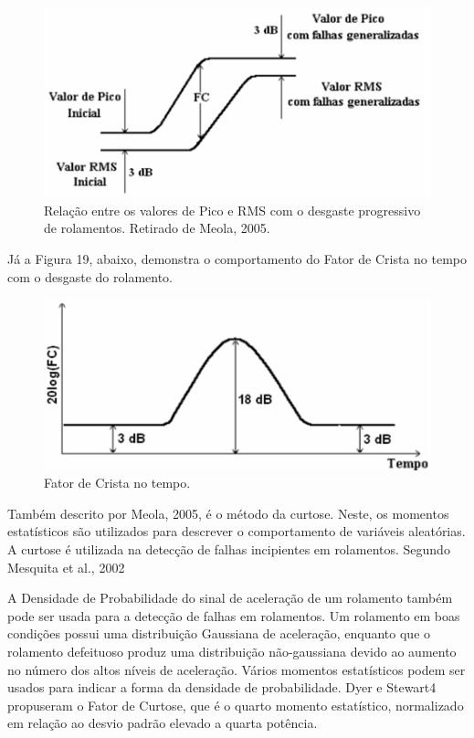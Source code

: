 \documentclass[
	12pt,				
	oneside,			
	a4paper,			
	english,			
	brazil				
	]{abntex2ppgsi}
\begin{document}
\begin{figure}[!htb]
\centering
\includegraphics{Figura18}
\caption {Relação entre os valores de Pico e RMS com o desgaste progressivo de rolamentos. Retirado de Meola, 2005.}
\label{Figura18}
\end{figure}	

Já a Figura 19, abaixo, demonstra o comportamento do Fator de Crista no tempo com o desgaste do rolamento.

\begin{figure}[!htb]
\centering
\includegraphics{Figura19}
\caption {Fator de Crista no tempo.}
\label{Figura19}
\end{figure}	

Também descrito por Meola, 2005, é o método da curtose. Neste, os momentos estatísticos são utilizados para descrever o comportamento de variáveis aleatórias. A curtose é utilizada na detecção de falhas incipientes em rolamentos. Segundo Mesquita et al., 2002

\begin{citacao}
A Densidade de Probabilidade do sinal de aceleração de um rolamento também pode ser usada para a detecção de falhas em rolamentos. Um rolamento em boas condições possui uma distribuição Gaussiana de aceleração, enquanto que o rolamento defeituoso produz uma distribuição não-gaussiana devido ao aumento no número dos altos níveis de aceleração.
Vários momentos estatísticos podem ser usados para indicar a forma da densidade de probabilidade. Dyer e Stewart4 propuseram o Fator de Curtose, que é o quarto momento estatístico, normalizado em relação ao desvio padrão elevado a quarta potência.
\end{citacao}
\end{document}
